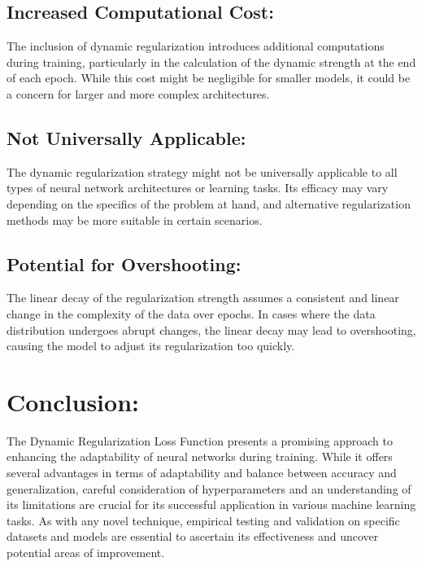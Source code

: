 \documentclass{article}
\begin{document}
\subsection{Increased Computational Cost:}
The inclusion of dynamic regularization introduces additional computations during training, particularly in the calculation of the dynamic strength at the end of each epoch. While this cost might be negligible for smaller models, it could be a concern for larger and more complex architectures.

\subsection{Not Universally Applicable:}
The dynamic regularization strategy might not be universally applicable to all types of neural network architectures or learning tasks. Its efficacy may vary depending on the specifics of the problem at hand, and alternative regularization methods may be more suitable in certain scenarios.

\subsection{Potential for Overshooting:}
The linear decay of the regularization strength assumes a consistent and linear change in the complexity of the data over epochs. In cases where the data distribution undergoes abrupt changes, the linear decay may lead to overshooting, causing the model to adjust its regularization too quickly.


\section{Conclusion:}

The Dynamic Regularization Loss Function presents a promising approach to enhancing the adaptability of neural networks during training. While it offers several advantages in terms of adaptability and balance between accuracy and generalization, careful consideration of hyperparameters and an understanding of its limitations are crucial for its successful application in various machine learning tasks. As with any novel technique, empirical testing and validation on specific datasets and models are essential to ascertain its effectiveness and uncover potential areas of improvement.
\end{document}
